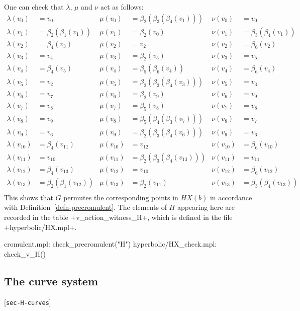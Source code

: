 \documentclass[reqno]{amsart}
\newcommand{\lbl}[1]{\label{#1}\textup{[\texttt{#1}]}\par}
\newcommand{\lbl}{\label}
\newcommand{\bt}        {\beta}
\newcommand{\lm}        {\lambda}
\renewcommand{\:}{\colon}
\theoremstyle{definition}
\begin{document}
One can check that $\lm$, $\mu$ and $\nu$ act as follows:
\begin{align*}
 \lm(v_{ 0}) &= v_{ 0} &
 \mu(v_{ 0}) &= \bt_2(\bt_3(\bt_4(v_{ 1}))) &
 \nu(v_{ 0}) &= v_{ 0} \\
 \lm(v_{ 1}) &= \bt_2(\bt_1(v_{ 1})) &
 \mu(v_{ 1}) &= \bt_2(v_{ 0}) &
 \nu(v_{ 1}) &= \bt_3(\bt_4(v_{ 1})) \\
 \lm(v_{ 2}) &= \bt_4(v_{ 3}) &
 \mu(v_{ 2}) &= v_{ 2} &
 \nu(v_{ 2}) &= \bt_6(v_{ 2}) \\
 \lm(v_{ 3}) &= v_{ 4} &
 \mu(v_{ 3}) &= \bt_2(v_{ 5}) &
 \nu(v_{ 3}) &= v_{ 5} \\
 \lm(v_{ 4}) &= \bt_4(v_{ 5}) &
 \mu(v_{ 4}) &= \bt_5(\bt_6(v_{ 4})) &
 \nu(v_{ 4}) &= \bt_6(v_{ 4}) \\
 \lm(v_{ 5}) &= v_{ 2} &
 \mu(v_{ 5}) &= \bt_2(\bt_3(\bt_4(v_{ 3}))) &
 \nu(v_{ 5}) &= v_{ 3} \\
 \lm(v_{ 6}) &= v_{ 7} &
 \mu(v_{ 6}) &= \bt_2(v_{ 9}) &
 \nu(v_{ 6}) &= v_{ 9} \\
 \lm(v_{ 7}) &= v_{ 8} &
 \mu(v_{ 7}) &= \bt_5(v_{ 8}) &
 \nu(v_{ 7}) &= v_{ 8} \\
 \lm(v_{ 8}) &= v_{ 9} &
 \mu(v_{ 8}) &= \bt_5(\bt_4(\bt_3(v_{ 7}))) &
 \nu(v_{ 8}) &= v_{ 7} \\
 \lm(v_{ 9}) &= v_{ 6} &
 \mu(v_{ 9}) &= \bt_2(\bt_3(\bt_4(v_{ 6}))) &
 \nu(v_{ 9}) &= v_{ 6} \\
 \lm(v_{10}) &= \bt_4(v_{11}) &
 \mu(v_{10}) &= v_{12} &
 \nu(v_{10}) &= \bt_6(v_{10}) \\
 \lm(v_{11}) &= v_{10} &
 \mu(v_{11}) &= \bt_2(\bt_3(\bt_4(v_{13}))) &
 \nu(v_{11}) &= v_{11} \\
 \lm(v_{12}) &= \bt_4(v_{13}) &
 \mu(v_{12}) &= v_{10} &
 \nu(v_{12}) &= \bt_6(v_{12}) \\
 \lm(v_{13}) &= \bt_2(\bt_1(v_{12})) &
 \mu(v_{13}) &= \bt_2(v_{11}) &
 \nu(v_{13}) &= \bt_3(\bt_4(v_{13})) \\
\end{align*}
This shows that $G$ permutes the corresponding points in $HX(b)$ in
accordance with Definition~\ref{defn-precromulent}.  The elements of
$\Pi$ appearing here are recorded in the table
\mcode+v_action_witness_H+, which is defined in the file
\fname+hyperbolic/HX.mpl+.
\begin{checks}
 cromulent.mpl: check_precromulent("H")
 hyperbolic/HX_check.mpl: check_v_H()
\end{checks}

\subsection{The curve system}
\lbl{sec-H-curves}
\end{document}
